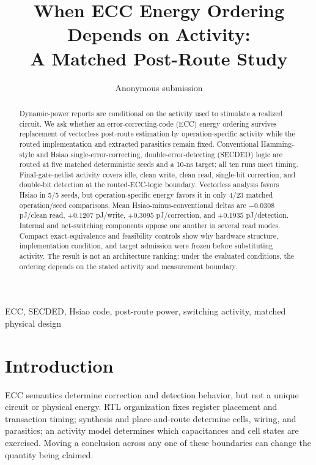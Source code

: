 \documentclass[conference,10pt]{IEEEtran}
\begin{document}
\title{When ECC Energy Ordering Depends on Activity:\\A Matched Post-Route Study}
\author{Anonymous submission}
\maketitle
\thispagestyle{empty}

\begin{abstract}
Dynamic-power reports are conditional on the activity used to stimulate a realized circuit. We ask whether an error-correcting-code (ECC) energy ordering survives replacement of vectorless post-route estimation by operation-specific activity while the routed implementation and extracted parasitics remain fixed. Conventional Hamming-style and Hsiao single-error-correcting, double-error-detecting (SECDED) logic are routed at five matched deterministic seeds and a 10-ns target; all ten runs meet timing. Final-gate-netlist activity covers idle, clean write, clean read, single-bit correction, and double-bit detection at the routed-ECC-logic boundary. Vectorless analysis favors Hsiao in 5/5 seeds, but operation-specific energy favors it in only 4/23 matched operation/seed comparisons. Mean Hsiao-minus-conventional deltas are $-0.0308$ pJ/clean read, $+0.1207$ pJ/write, $+0.3095$ pJ/correction, and $+0.1935$ pJ/detection. Internal and net-switching components oppose one another in several read modes. Compact exact-equivalence and feasibility controls show why hardware structure, implementation condition, and target admission were frozen before substituting activity. The result is not an architecture ranking: under the evaluated conditions, the ordering depends on the stated activity and measurement boundary.
\end{abstract}

\begin{IEEEkeywords}
ECC, SECDED, Hsiao code, post-route power, switching activity, matched physical design
\end{IEEEkeywords}

\section{Introduction}
ECC semantics determine correction and detection behavior, but not a unique circuit or physical energy. RTL organization fixes register placement and transaction timing; synthesis and place-and-route determine cells, wiring, and parasitics; an activity model determines which capacitances and cell states are exercised. Moving a conclusion across any one of these boundaries can change the quantity being claimed.
\end{document}
